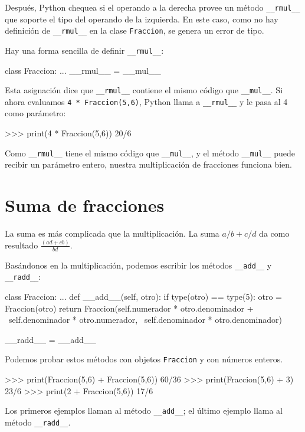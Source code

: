 Después, Python chequea si el operando a la derecha provee un método
\texttt{\_\_rmul\_\_} que soporte el tipo del operando de la izquierda.
En este caso, como no hay definición de \texttt{\_\_rmul\_\_} en la
clase \texttt{Fraccion}, se genera un error de tipo.

Hay una forma sencilla de definir \texttt{\_\_rmul\_\_}:
\begin{pythoncode}
class Fraccion:
  ...
  __rmul__ = __mul__
\end{pythoncode}
 Esta asignación dice que \texttt{\_\_rmul\_\_} contiene el mismo
código que \texttt{\_\_mul\_\_}. Si ahora evaluamos \texttt{4 {*}
Fraccion(5,6)}, Python llama a \texttt{\_\_rmul\_\_} y le pasa al
4 como parámetro:

\begin{pythoncode}
>>> print(4 * Fraccion(5,6))
20/6
\end{pythoncode}
 Como \texttt{\_\_rmul\_\_} tiene el mismo código que \texttt{\_\_mul\_\_},
y el método \texttt{\_\_mul\_\_} puede recibir un parámetro entero,
nuestra multiplicación de fracciones funciona bien.

\section{Suma de fracciones}

 

La suma es más complicada que la multiplicación. La suma $a/b+c/d$
da como resultado $\frac{(ad+cb)}{bd}$.

Basándonos en la multiplicación, podemos escribir los métodos \texttt{\_\_add\_\_}
y \texttt{\_\_radd\_\_}:

\begin{pythoncode}
class Fraccion:
  ...
  def __add__(self, otro):
    if type(otro) == type(5):
      otro = Fraccion(otro)
    return Fraccion(self.numerador   * otro.denominador + \
                    self.denominador * otro.numerador,    \
                    self.denominador * otro.denominador) 

  __radd__ = __add__
\end{pythoncode}
 Podemos probar estos métodos con objetos \texttt{Fraccion} y con
números enteros.

\begin{pythoncode}
>>> print(Fraccion(5,6) + Fraccion(5,6))
60/36
>>> print(Fraccion(5,6) + 3)
23/6
>>> print(2 + Fraccion(5,6))
17/6
\end{pythoncode}
 Los primeros ejemplos llaman al método \texttt{\_\_add\_\_}; el último
ejemplo llama al método \texttt{\_\_radd\_\_}.


